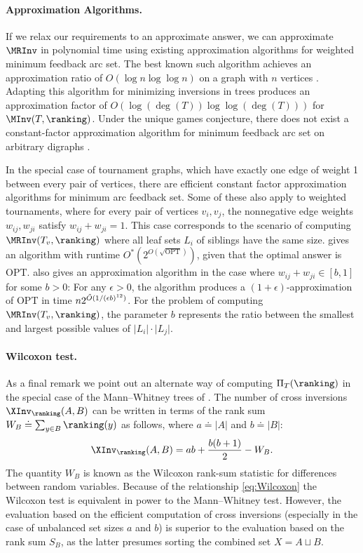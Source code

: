 \documentclass{toc}
\begin{document}
\paragraph{Approximation Algorithms.} If we relax our requirements to an approximate answer, we can approximate $\MRInv$ in polynomial time using existing approximation algorithms for weighted minimum feedback arc set. The best known such algorithm achieves an approximation ratio of $O(\log n\log\log n)$ on a graph with $n$ vertices \cite{ENSS98}. Adapting this algorithm for minimizing inversions in trees produces an approximation factor of $O(\log (\deg(T)) \log\log (\deg(T)))$ for $\MInv(T,\ranking)$. Under the unique games conjecture, there does not exist a constant-factor approximation algorithm for minimum feedback arc set on arbitrary digraphs \cite{GHMRC11}.

In the special case of tournament graphs, which have exactly one edge of weight 1 between every pair of vertices, there are efficient constant factor approximation algorithms for minimum arc feedback set. Some of these also apply to weighted tournaments, where for every pair of vertices $v_i,v_j$, the nonnegative edge weights $w_{ij},w_{ji}$ satisfy $w_{ij}+w_{ji}=1$. This case corresponds to the scenario of computing $\MRInv(T_v,\ranking)$ where all leaf sets $L_i$ of siblings have the same size. \cite{KS10} gives an algorithm with runtime $O^*(2^{O(\sqrt{\mathrm{OPT}})})$, given that the optimal answer is $\mathrm{OPT}$. \cite{KMS07} also gives an approximation algorithm in the case where $w_{ij}+w_{ji}\in [b,1]$ for some $b>0$: For any $\epsilon>0$, the algorithm produces a $(1+\epsilon)$-approximation of $\mathrm{OPT}$ in time $n 2^{\Tilde{O}(1/(\epsilon b)^{12}) }$. For the problem of computing $\MRInv(T_v,\ranking)$, the parameter $b$ represents the ratio between the smallest and largest possible values of $\lvert L_i\rvert\cdot\lvert L_j\rvert$.

\paragraph{Wilcoxon test.} As a final remark we point out an alternate way of computing $\Pi_T(\ranking)$ in the special case of the Mann--Whitney trees of . The number of cross inversions $\XInv_\ranking(A,B)$ can be written in terms of the rank sum $W_B \doteq \sum_{y \in B} \ranking(y)$ as follows, where $a \doteq |A|$ and $b \doteq |B|$:
\begin{equation}\label{eq:Wilcoxon}
\XInv_\ranking(A,B) = ab + \frac{b(b+1)}{2} - W_B.
\end{equation}
The quantity $W_B$ is known as the Wilcoxon rank-sum statistic for differences between random variables. Because of the relationship \eqref{eq:Wilcoxon} the Wilcoxon test is equivalent in power to the Mann--Whitney test. However, the evaluation based on the efficient computation of cross inversions (especially in the case of unbalanced set sizes $a$ and $b$) is superior to the evaluation based on the rank sum $S_B$, as the latter presumes sorting the combined set $X = A \sqcup B$.
\end{document}
